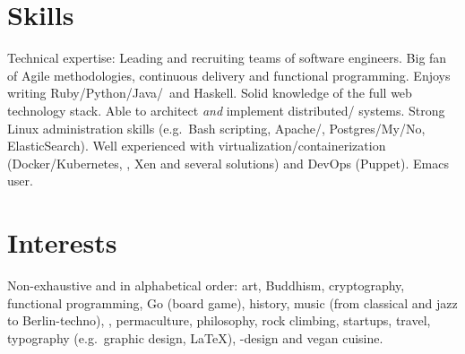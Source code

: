 \documentclass[10pt,a4paper]{article}
\begin{document}
\spacedhrule{0.5em}{-0.4em}

\section*{Skills}

\inlineheadsection  %
  {Technical expertise:}
  {Leading and recruiting teams of software engineers.  Big fan of Agile methodologies, continuous delivery and functional programming.  Enjoys writing Ruby/\nsp Python/\nsp Java/\nsp \CPP~and Haskell.  Solid knowledge of the full web technology stack.  Able to architect \textit{and} implement distributed/ systems.  Strong Linux administration skills (e.g.\ Bash scripting, Apache/, Postgres/My/No, ElasticSearch).  Well experienced with virtualization/containerization (Docker/Kubernetes, , Xen and several  solutions) and DevOps (Puppet).  Emacs user.}


\spacedhrule{1.6em}{-0.4em}

\section*{Interests}

\inlineheadsection
  {Non-exhaustive and in alphabetical order:}
  {art, Buddhism, cryptography, functional programming, Go (board game), history, music (from classical and jazz to Berlin-techno), , permaculture, philosophy, rock climbing, startups, travel, typography (e.g.\ graphic design, \LaTeX), -design and vegan cuisine.}
\end{document}
